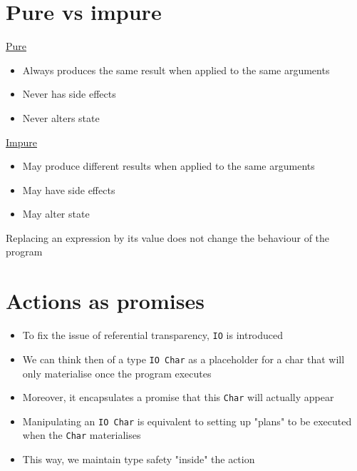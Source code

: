 \documentclass{article}[18pt]
\begin{document}
\section{Pure vs impure}
\begin{minipage}{0.5\textwidth}
\underline{Pure}
\begin{itemize}
	\item Always produces the same result when applied to the same arguments
	\item Never has side effects
	\item Never alters state
\end{itemize}
\end{minipage}
\begin{minipage}{0.5\textwidth}
\underline{Impure}
\begin{itemize}
	\item May produce different results when applied to the same arguments
	\item May have side effects
	\item May alter state
\end{itemize}
\end{minipage}
\begin{defin}
	Replacing an expression by its value does not change the behaviour of the program
\end{defin}
\section{Actions as promises}
\begin{itemize}
	\item To fix the issue of referential transparency, \texttt{IO} is introduced
	\item We can think then of a type \texttt{IO Char} as a placeholder for a char that will only materialise once the program executes
	\item Moreover, it encapsulates a promise that this \texttt{Char} will actually appear
	\item Manipulating an \texttt{IO Char} is equivalent to setting up "plans" to be executed when the \texttt{Char} materialises
	\item This way, we maintain type safety "inside" the action
\end{itemize}
\end{document}

